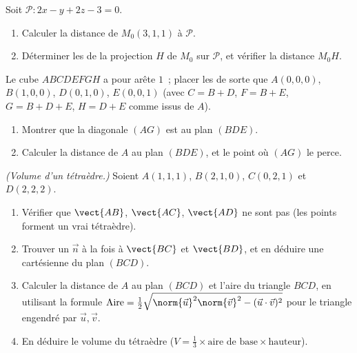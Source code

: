\begin{exercise}[$\star\star$]\label{exo:g12:space:7}
Soit $\mathcal P : 2x - y + 2z - 3 = 0$.
\begin{enumerate}
  \item Calculer la distance de $M_0(3, 1, 1)$ à $\mathcal P$.
  \item Déterminer les  de la projection  $H$ de
        $M_0$ sur $\mathcal P$, et vérifier la distance $M_0H$.
\end{enumerate}
\end{exercise}

\begin{exercise}[$\star\star\star$]\label{exo:g12:space:8}
Le cube $ABCDEFGH$ a pour arête $1$~; placer les  de sorte que
$A(0,0,0)$, $B(1,0,0)$, $D(0,1,0)$, $E(0,0,1)$ (avec
$C = B + D$, $F = B + E$, $G = B + D + E$, $H = D + E$ comme  issus
de $A$).
\begin{enumerate}
  \item Montrer que la diagonale $(AG)$ est  au plan $(BDE)$.
  \item Calculer la distance de $A$ au plan $(BDE)$, et le point où $(AG)$
        le perce.
\end{enumerate}
\end{exercise}

\begin{exercise}[$\star\star\star$]\label{exo:g12:space:9}
\emph{(Volume d'un tétraèdre.)} Soient $A(1,1,1)$, $B(2,1,0)$, $C(0,2,1)$
et $D(2,2,2)$.
\begin{enumerate}
  \item Vérifier que $\vect{AB}$, $\vect{AC}$, $\vect{AD}$ ne sont pas
         (les points forment un vrai tétraèdre).
  \item Trouver un  $\vec n$  à la fois à $\vect{BC}$ et
        $\vect{BD}$, et en déduire une  cartésienne du plan
        $(BCD)$.
  \item Calculer la distance de $A$ au plan $(BCD)$ et l'aire du triangle
        $BCD$, en utilisant la formule
        $\text{Aire} = \frac12\sqrt{\norm{\vec u}^2\norm{\vec v}^2 -
        (\vec u \cdot \vec v)^2}$ pour le triangle engendré par
        $\vec u, \vec v$.
  \item En déduire le volume du tétraèdre
        ($V = \frac13 \times \text{aire de base} \times \text{hauteur}$).
\end{enumerate}
\end{exercise}

